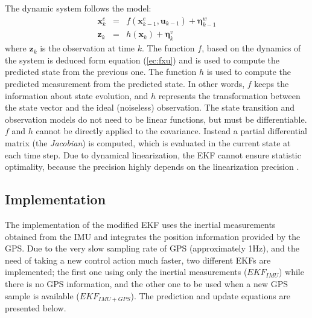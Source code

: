 \documentclass[conference]{IEEEtran}
\newcommand{\refp}[1]{(\ref{#1})}
\begin{document}
The dynamic system follows the model:
\begin{eqnarray}
	\mathbf{x}_{k}^e &=& f(\mathbf{x}_{k-1}^e, \mathbf{u}_{k-1}) + \boldsymbol{\eta}^w_{k-1}\\
	\mathbf{z}_{k} &=& h(\mathbf{x}_{k}) + \boldsymbol{\eta}^{v}_{k}
\end{eqnarray}
where $\mathbf{z}_{k}$ is the observation at time $k$. The function $f$, based on the dynamics of the system is deduced form equation \refp{ec:fxu} and is used to compute the predicted state from the previous one. The function $h$ is used to compute the predicted measurement from the predicted state. In other words, $f$ keeps the information about state evolution, and $h$ represents the transformation between the state vector and the ideal (noiseless) observation. The state transition and observation models do not need to be linear functions, but must be differentiable. $f$ and $h$ cannot be directly applied to the covariance. Instead a partial differential matrix (the \emph{Jacobian}) is computed, which is evaluated in the current state at each time step. Due to dynamical linearization, the EKF cannot ensure statistic optimality, because the precision highly depends on the linearization precision \cite{bib:kay}.

\subsection{Implementation}
The implementation of the modified EKF uses the inertial measurements obtained from the IMU and integrates the position information provided by the GPS. Due to the very slow sampling rate of GPS (approximately 1Hz), and the need of taking a new control action much faster, two different EKFs are implemented; the first one using only the inertial measurements ($EKF_{IMU}$) while there is no GPS information, and the other one to be used when a new GPS sample is available ($EKF_{IMU+GPS}$). The prediction and update equations are presented below.\vspace{10pt}
\end{document}
